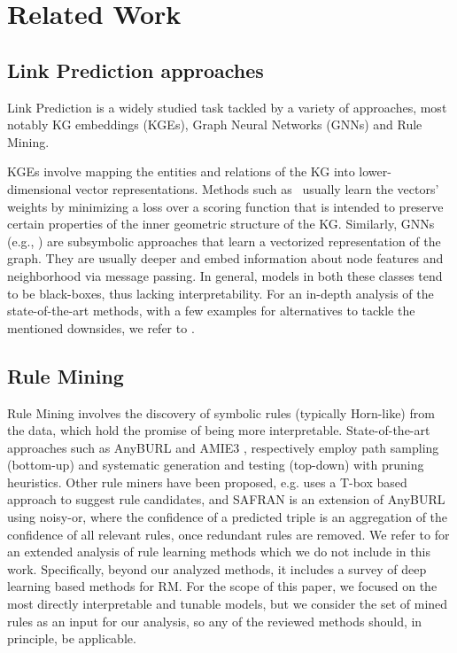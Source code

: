 \documentclass[a4paper,UKenglish,cleveref, autoref, thm-restate]{tgdk-v2021}
\begin{document}
\section{Related Work}

\subsection{Link Prediction approaches}
Link Prediction is a widely studied task  tackled by a variety of approaches, most notably KG embeddings (KGEs), Graph Neural Networks (GNNs) and Rule Mining. 

KGEs involve mapping the entities and relations of the KG into lower-dimensional vector representations. Methods such as~\cite{bordes_translating_2013, sun_rotate_2019,trouillon_complex_2016} usually learn the vectors' weights by minimizing a loss over a scoring function that is intended to preserve certain properties of the inner geometric structure of the KG. Similarly, GNNs (e.g., \cite{kipf_semi-supervised_2016,zeb_complex_2022}) are subsymbolic approaches that learn a vectorized representation of the graph. They are usually deeper and embed information about node features and neighborhood via message passing. In general, models in both these classes tend to be black-boxes, thus lacking interpretability. For an in-depth analysis of the state-of-the-art methods, with a few examples for alternatives to tackle the mentioned downsides, we refer to \cite{arrar_comprehensive_2024}.

\subsection{Rule Mining}
Rule Mining \cite{zeng_logical_2023} involves the discovery of symbolic rules (typically Horn-like) from the data, which hold the promise of being more interpretable. State-of-the-art approaches such as AnyBURL \cite{meilicke_anytime_2024} and AMIE3 \cite{harth_fast_2020}, respectively employ path sampling (bottom-up) and systematic generation and testing (top-down) with pruning heuristics.
Other rule miners have been proposed, e.g. \cite{pirro_relatedness_2020} uses a T-box based approach to suggest rule candidates, and SAFRAN \cite{ott_safran_2021} is an extension of AnyBURL using noisy-or, where the confidence of a predicted triple is an aggregation of the confidence of all relevant rules, once redundant rules are removed. 
We refer to \cite{wu_rule_2023} for an extended analysis of rule learning methods which we do not include in this work. Specifically, beyond our analyzed methods, it includes a survey of deep learning based methods for RM. For the scope of this paper, we focused on the most directly interpretable and tunable models, but we consider the set of mined rules as an input for our analysis, so any of the reviewed methods should, in principle, be applicable.
\end{document}

